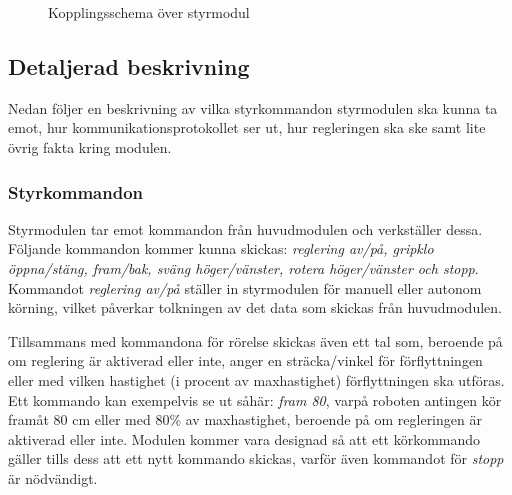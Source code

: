 \documentclass[11pt]{article}
\begin{document}
\begin{flushleft}
\begin{figure}[htbp]
\centering
\noindent{}
	\caption{Kopplingsschema över styrmodul \label{kopplingsschema:styrmodul}}	
\end{figure}
 
\subsection{Detaljerad beskrivning}
Nedan följer en beskrivning av vilka styrkommandon styrmodulen ska kunna ta emot, hur kommunikationsprotokollet ser ut, hur regleringen ska ske samt lite övrig fakta kring modulen.

\subsubsection{Styrkommandon}\label{Styrkommandon}
Styrmodulen tar emot kommandon från huvudmodulen och verkställer dessa. Följande kommandon kommer kunna skickas: \textit{reglering av/på, gripklo öppna/stäng, fram/bak, sväng höger/vänster, rotera höger/vänster och stopp}. Kommandot \textit{reglering av/på} ställer in styrmodulen för manuell eller autonom körning, vilket påverkar tolkningen av det data som skickas från huvudmodulen.

Tillsammans med kommandona för rörelse skickas även ett tal som, beroende på om reglering är aktiverad eller inte, anger en sträcka/vinkel för förflyttningen eller med vilken hastighet (i procent av maxhastighet) förflyttningen ska utföras. Ett kommando kan exempelvis se ut såhär: \textit{fram 80}, varpå roboten antingen kör framåt 80 cm eller med 80\% av maxhastighet, beroende på om regleringen är aktiverad eller inte. Modulen kommer vara designad så att ett körkommando gäller tills dess att ett nytt kommando skickas, varför även kommandot för \textit{stopp} är nödvändigt.


\end{flushleft}
\end{document}
